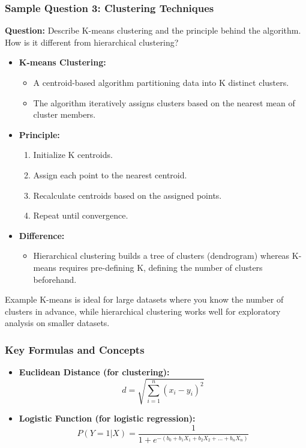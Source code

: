 \documentclass{beamer}
\begin{document}
\begin{frame}[fragile]
    \frametitle{Sample Question 3: Clustering Techniques}
    \textbf{Question:} Describe K-means clustering and the principle behind the algorithm. How is it different from hierarchical clustering?
    
    \begin{itemize}
        \item \textbf{K-means Clustering:}
        \begin{itemize}
            \item A centroid-based algorithm partitioning data into K distinct clusters.
            \item The algorithm iteratively assigns clusters based on the nearest mean of cluster members.
        \end{itemize}

        \item \textbf{Principle:}
        \begin{enumerate}
            \item Initialize K centroids.
            \item Assign each point to the nearest centroid.
            \item Recalculate centroids based on the assigned points.
            \item Repeat until convergence.
        \end{enumerate}

        \item \textbf{Difference:}
        \begin{itemize}
            \item Hierarchical clustering builds a tree of clusters (dendrogram) whereas K-means requires pre-defining K, defining the number of clusters beforehand.
        \end{itemize}
    \end{itemize}

    \begin{block}{Example}
        K-means is ideal for large datasets where you know the number of clusters in advance, while hierarchical clustering works well for exploratory analysis on smaller datasets.
    \end{block}
\end{frame}

\begin{frame}[fragile]
    \frametitle{Key Formulas and Concepts}
    \begin{itemize}
        \item \textbf{Euclidean Distance (for clustering):}
        \begin{equation}
            d = \sqrt{\sum_{i=1}^n (x_i - y_i)^2}
        \end{equation}

        \item \textbf{Logistic Function (for logistic regression):}
        \begin{equation}
            P(Y=1|X) = \frac{1}{1 + e^{-(b_0 + b_1X_1 + b_2X_2 + ... + b_nX_n)}}
        \end{equation}
    \end{itemize}
\end{frame}
\end{document}
